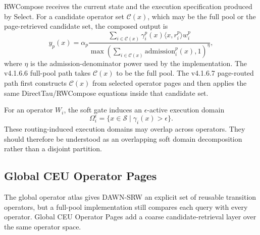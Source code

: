 \documentclass{article}
\begin{document}
RWCompose receives the current state and the execution specification produced by Select. For a candidate operator set \(\mathcal{C}(x)\), which may be the full pool or the page-retrieved candidate set, the composed output is
\begin{equation}
    y_p(x)=
    \alpha_p
    \frac{\sum_{i\in\mathcal{C}(x)}\gamma_i^p(x)\langle x,r_i^p\rangle w_i^p}
    {\max\left(\sum_{i\in\mathcal{C}(x)}\mathrm{admission}_i^p(x),1\right)^{\eta}} ,
    \label{eq:method_candidate_rwcompose}
\end{equation}
where \(\eta\) is the admission-denominator power used by the implementation. The v4.1.6.6 full-pool path takes \(\mathcal{C}(x)\) to be the full pool. The v4.1.6.7 page-routed path first constructs \(\mathcal{C}(x)\) from selected operator pages and then applies the same DirectTau/RWCompose equations inside that candidate set.

For an operator \(W_i\), the soft gate induces an \(\epsilon\)-active execution domain
\begin{equation}
    \Omega_i^\epsilon=\{x\in\mathcal{S}\mid \gamma_i(x)>\epsilon\}.
\end{equation}
These routing-induced execution domains may overlap across operators. They should therefore be understood as an overlapping soft domain decomposition rather than a disjoint partition.

\subsection{Global CEU Operator Pages}
\label{sec:operator_pages_method}

The global operator atlas gives DAWN-SRW an explicit set of reusable transition operators, but a full-pool implementation still compares each query with every operator. Global CEU Operator Pages add a coarse candidate-retrieval layer over the same operator space.
\end{document}

